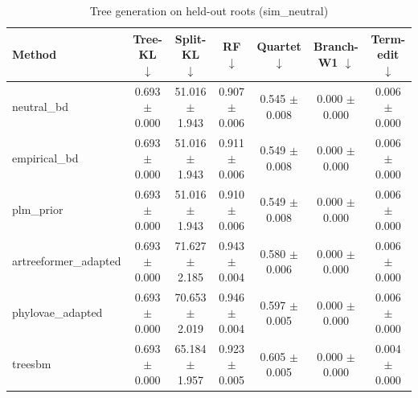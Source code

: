 \begin{table}[t]\centering
\caption{Tree generation on held-out roots (sim_neutral)}
\begin{tabular}{lcccccc}
\toprule
Method & Tree-KL $\downarrow$ & Split-KL $\downarrow$ & RF $\downarrow$ & Quartet $\downarrow$ & Branch-W1 $\downarrow$ & Term-edit $\downarrow$ \\
\midrule
neutral\_bd & 0.693 $\pm$ 0.000 & 51.016 $\pm$ 1.943 & 0.907 $\pm$ 0.006 & 0.545 $\pm$ 0.008 & 0.000 $\pm$ 0.000 & 0.006 $\pm$ 0.000 \\
empirical\_bd & 0.693 $\pm$ 0.000 & 51.016 $\pm$ 1.943 & 0.911 $\pm$ 0.006 & 0.549 $\pm$ 0.008 & 0.000 $\pm$ 0.000 & 0.006 $\pm$ 0.000 \\
plm\_prior & 0.693 $\pm$ 0.000 & 51.016 $\pm$ 1.943 & 0.910 $\pm$ 0.006 & 0.549 $\pm$ 0.008 & 0.000 $\pm$ 0.000 & 0.006 $\pm$ 0.000 \\
artreeformer\_adapted & 0.693 $\pm$ 0.000 & 71.627 $\pm$ 2.185 & 0.943 $\pm$ 0.004 & 0.580 $\pm$ 0.006 & 0.000 $\pm$ 0.000 & 0.006 $\pm$ 0.000 \\
phylovae\_adapted & 0.693 $\pm$ 0.000 & 70.653 $\pm$ 2.019 & 0.946 $\pm$ 0.004 & 0.597 $\pm$ 0.005 & 0.000 $\pm$ 0.000 & 0.006 $\pm$ 0.000 \\
treesbm & 0.693 $\pm$ 0.000 & 65.184 $\pm$ 1.957 & 0.923 $\pm$ 0.005 & 0.605 $\pm$ 0.005 & 0.000 $\pm$ 0.000 & 0.004 $\pm$ 0.000 \\
\bottomrule
\end{tabular}
\end{table}